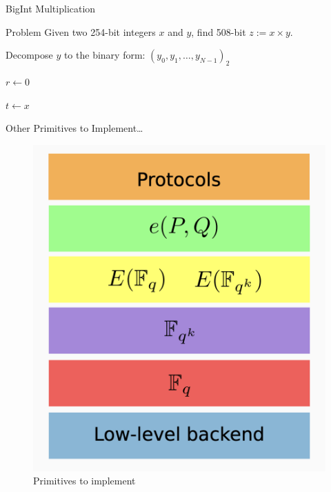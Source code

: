 \documentclass{zkdl-presentation-template}
\begin{document}
    \begin{frame}[fragile]{BigInt Multiplication}
        \begin{block}{Problem}
            Given two 254-bit integers $x$ and $y$, find 508-bit $z := x \times y$.
        \end{block}

        \small
        \begin{algorithm}[H]
          \caption{Double-and-add method for integer multiplication}\label{alg:double_and_add}
          
          Decompose $y$ to the binary form: $(y_0,y_1,\dots,y_{N-1})_2$
          
          $r \gets 0$
          
          $t \gets x$
          
          
          
        \end{algorithm}
    \end{frame}

    \begin{frame}[fragile]{Other Primitives to Implement\ldots}
        \begin{figure}
            \centering
            \includegraphics[width=0.575\linewidth]{images/levels.png}
            \caption{Primitives to implement}
            \label{fig:primitives}
        \end{figure}
    \end{frame}
\end{document}
